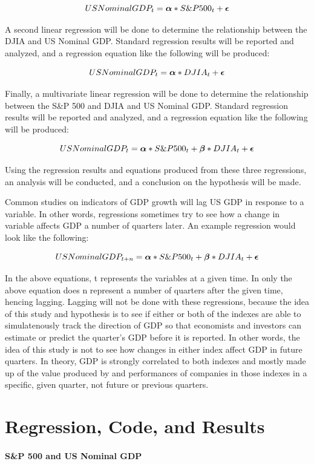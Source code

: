 \documentclass[11pt]{article}
\numberwithin{equation}{section}
\def\alp{\mbox{\boldmath$\alpha$\unboldmath}}
\def\bet{\mbox{\boldmath$\beta$\unboldmath}}
\def\epsi{\mbox{\boldmath$\epsilon$\unboldmath}}
\begin{document}
\[ US Nominal GDP_{t} = \alp*S\&P500_{t} + \epsi \]

A second linear regression will be done to determine the relationship between the DJIA and US Nominal GDP. Standard regression results will be reported and analyzed, and a regression equation like the following will be produced:

\[ US Nominal GDP_{t} = \alp*DJIA_{t} + \epsi \]

Finally, a multivariate linear regression will be done to determine the relationship between the S\&P 500 and DJIA and US Nominal GDP. Standard regression results will be reported and analyzed, and a regression equation like the following will be produced:

\[ US Nominal GDP_{t} = \alp*S\&P500_{t} + \bet*DJIA_{t} + \epsi \]

Using the regression results and equations produced from these three regressions, an analysis will be conducted, and a conclusion on the hypothesis will be made.

Common studies on indicators of GDP growth will lag US GDP in response to a variable. In other words, regressions sometimes try to see how a change in variable affects GDP a number of quarters later. An example regression would look like the following:

\[ US Nominal GDP_{t+n} = \alp*S\&P500_{t} + \bet*DJIA_{t} + \epsi \]

In the above equations, t represents the variables at a given time. In only the above equation does n represent a number of quarters after the given time, hencing lagging. Lagging will not be done with these regressions, because the idea of this study and hypothesis is to see if either or both of the indexes are able to simulatenously track the direction of GDP so that economists and investors can estimate or predict the quarter's GDP before it is reported. In other words, the idea of this study is not to see how changes in either index affect GDP in future quarters. In theory, GDP is strongly correlated to both indexes and mostly made up of the value produced by and performances of companies in those indexes in a specific, given quarter, not future or previous quarters.

\section{Regression, Code, and Results}

\paragraph{S\&P 500 and US Nominal GDP}
\end{document}
